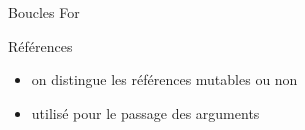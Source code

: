 \begin{frame}[fragile]{Boucles For}
\protect\hypertarget{boucles-for}{}
\begin{Shaded}
\begin{Highlighting}[]
     \OperatorTok{=} \OperatorTok{;}
      \OperatorTok{\{}
\OperatorTok{+=}\OperatorTok{;}
    \OperatorTok{\}}
    \OperatorTok{,} \OperatorTok{*}\OperatorTok{/}\NormalTok{)}\OperatorTok{;}
    \OperatorTok{=} \NormalTok{[}\OperatorTok{,}\OperatorTok{,}\NormalTok{]}\OperatorTok{;}
     \OperatorTok{\&}\OperatorTok{\{}
        \NormalTok{(}\OperatorTok{,}\OperatorTok{;}
    \OperatorTok{\}}
\end{Highlighting}
\end{Shaded}
\end{frame}

\begin{frame}[fragile]{Références}
\protect\hypertarget{ruxe9fuxe9rences}{}
\begin{Shaded}
\begin{Highlighting}[]
\OperatorTok{=} \OperatorTok{;}
\OperatorTok{=} \OperatorTok{\&}\OperatorTok{;}
\OperatorTok{=} \OperatorTok{*}\OperatorTok{;}
 \OperatorTok{=} \OperatorTok{;}
\OperatorTok{=} \OperatorTok{\&}\OperatorTok{;}
\OperatorTok{*}\OperatorTok{=} \OperatorTok{;}
\OperatorTok{,} \NormalTok{)}\OperatorTok{;}
\end{Highlighting}
\end{Shaded}

\begin{itemize}
\tightlist
\item
  on distingue les références mutables ou non
\item
  utilisé pour le passage des arguments
\end{itemize}
\end{frame}


